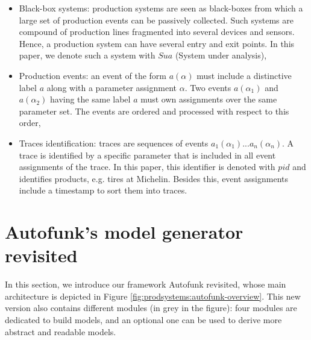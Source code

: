 \begin{itemize}
    \item Black-box systems: production systems are seen as
    black-boxes from which a large set of production events can
    be passively collected. Such systems are compound of
    production lines fragmented into several devices and sensors.
    Hence, a production system can have several entry and exit
    points. In this paper, we denote such a system with $Sua$
    (System under analysis),

    \item Production events: an event of the form $a(\alpha)$
    must include a distinctive label $a$ along with a parameter
    assignment $\alpha$. Two events $a(\alpha_1)$ and
    $a(\alpha_2)$ having the same label $a$ must own assignments
    over the same parameter set. The events are ordered and
    processed with respect to this order,

    \item Traces identification: traces are sequences of events
    $a_1(\alpha_1)$...$a_n(\alpha_n)$. A trace is identified by a
    specific parameter that is included in all event assignments
    of the trace. In this paper, this identifier is denoted with
    $pid$ and identifies products, e.g. tires at Michelin.
    Besides this, event assignments include a timestamp to sort
    them into traces.
\end{itemize}


\section{Autofunk's model generator revisited}
\label{sec:modelinf:prodsystems}

In this section, we introduce our framework Autofunk revisited,
whose main architecture is depicted in Figure
\ref{fig:prodsystems:autofunk-overview}. This new version also
contains different modules (in grey in the figure): four modules
are dedicated to build models, and an optional one can be used to
derive more abstract and readable models.

